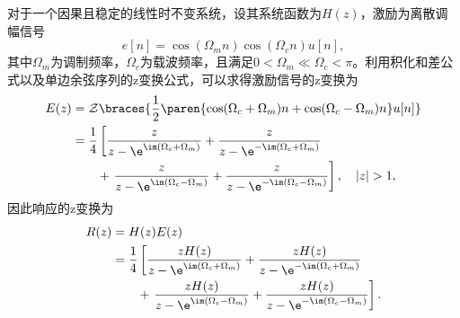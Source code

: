 \begin{example}
    对于一个因果且稳定的线性时不变系统，设其系统函数为$H(z)$，激励为离散调幅信号
    \begin{equation}
        e[n]=\cos(\Omega_m n)\cos(\Omega_c n)u[n],
    \end{equation}
    其中$\Omega_m$为调制频率，$\Omega_c$为载波频率，且满足$0<\Omega_m\ll\Omega_c<\pi$。利用积化和差公式以及单边余弦序列的z变换公式，可以求得激励信号的z变换为
    \begin{align}
        E(z)&=\mathcal{Z}\braces{\frac{1}{2}\paren{\cos(\Omega_c+\Omega_m)n+\cos(\Omega_c-\Omega_m)n}u[n]} \nonumber \\
        &=\frac{1}{4}\left[\frac{z}{z-\e^{\im(\Omega_c+\Omega_m)}}+\frac{z}{z-\e^{-\im(\Omega_c+\Omega_m)}}\right. \nonumber \\
        &\qquad+\left.\frac{z}{z-\e^{\im(\Omega_c-\Omega_m)}}+\frac{z}{z-\e^{-\im(\Omega_c-\Omega_m)}}\right],\quad |z|>1,
    \end{align}
    因此响应的z变换为
    \begin{align}
        R(z)&=H(z)E(z) \nonumber \\
        &=\frac{1}{4}\left[\frac{zH(z)}{z-\e^{\im(\Omega_c+\Omega_m)}}+\frac{zH(z)}{z-\e^{-\im(\Omega_c+\Omega_m)}}\right. \nonumber \\
        &\qquad+\left.\frac{zH(z)}{z-\e^{\im(\Omega_c-\Omega_m)}}+\frac{zH(z)}{z-\e^{-\im(\Omega_c-\Omega_m)}}\right].
    \end{align}


\end{example}
